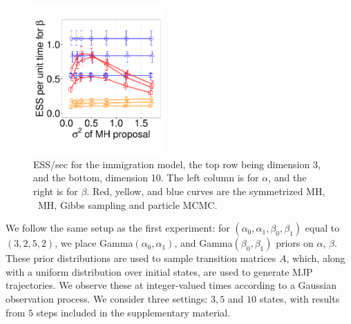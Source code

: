 {\begin{figure}
\begin{minipage}[hp]{0.78\linewidth}
    \includegraphics [width=0.44\textwidth, angle=0]{figures_new_apr12/Q_beta_dim10_18apr12.pdf}
  \end{minipage}
  \begin{minipage}[!hp]{0.21\linewidth}
    \caption{ESS/sec for the immigration model, the top row being dimension 3, and the bottom,
      dimension 10. The left column is for $\alpha$, and the 
    right is for $\beta$. Red, yellow, and blue curves are the symmetrized MH,
  \naive\ MH, Gibbs sampling and particle MCMC.}
     \label{fig:ESS_Q_D10}
  \end{minipage}
  \end{figure}
We follow the same setup as the first experiment:
for $(\alpha_0,\alpha_1,\beta_0,\beta_1)$ equal to $(3,2,5,2)$,
we place Gamma$(\alpha_0,\alpha_1)$, and Gamma$(\beta_0, \beta_1)$ priors on 
$\alpha$, $\beta$. These prior distributions are used to sample transition 
matrices $A$, which, along with a uniform distribution over initial states,
are used to generate MJP trajectories. We observe these at integer-valued
times according to a Gaussian observation process.
We consider three settings: $3, 5$ and $10$ states, with results from $5$ 
steps included in the supplementary material. 

}
